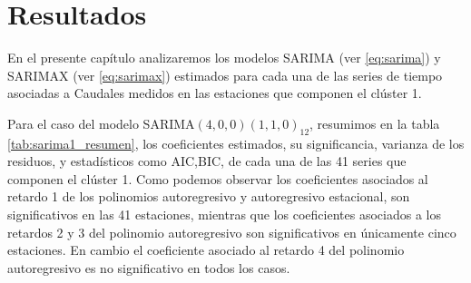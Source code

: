 \documentclass[12pt,oneside]{book}\usepackage[]{graphicx}\usepackage[]{color}
\theoremstyle{definition} %
\begin{document}

\chapter{Resultados}
\label{chap:resultados}
En el presente capítulo analizaremos los modelos SARIMA (ver \ref{eq:sarima}) y SARIMAX (ver \ref{eq:sarimax}) estimados para cada una de las series de tiempo asociadas a Caudales medidos en las estaciones que componen el clúster 1. 



Para el caso del modelo SARIMA$(4,0,0)(1,1,0)_{12}$, resumimos en la tabla \ref{tab:sarima1_resumen}, los coeficientes estimados, su significancia, varianza de los residuos, y estadísticos como AIC,BIC, de cada una de las 41 series que componen el clúster 1. Como podemos observar los coeficientes asociados al retardo 1 de los polinomios autoregresivo y autoregresivo estacional, son significativos en las 41 estaciones, mientras que los coeficientes asociados a los retardos 2 y 3 del polinomio autoregresivo son significativos en únicamente cinco estaciones. En cambio el coeficiente asociado al retardo 4 del polinomio autoregresivo es no significativo en todos los casos.
\end{document}
